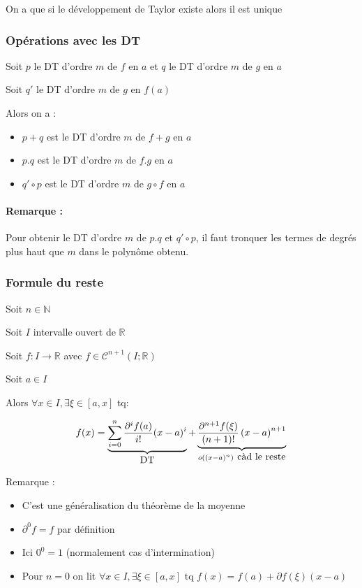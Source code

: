 \documentclass[a4paper,10pt]{article}
\newcommand{\rd}{\circ}
\newcommand{\ap}{\rightarrow}
\newcommand{\R}{\mathbb{R}}
\newcommand{\N}{\mathbb{N}}
\newcommand{\cclass}[3]{\mathcal{C}^{#1} (#2;#3)}
\begin{document}
On a que si le développement de Taylor existe alors il est unique

\subsubsection{Opérations avec les DT}

Soit $p$ le DT d'ordre $m$ de $f$ en $a$ et $q$ le DT d'ordre $m$ de $g$ en $a$

Soit $q'$ le DT d'ordre $m$ de $g$ en $f(a)$

Alors on a :

\begin{itemize}
	\item{$p+q$ est le DT d'ordre $m$ de $f+g$ en $a$}
	\item{$p.q$ est le DT d'ordre $m$ de $f.g$ en $a$}
	\item{$q' \rd p$ est le DT d'ordre $m$ de $g \rd f$ en $a$}
\end{itemize}
\paragraph{Remarque :} Pour obtenir le DT d'ordre $m$ de $p.q$ et $q' \rd p$, il faut tronquer les termes de degrés plus haut que $m$ dans le polynôme obtenu.

\subsubsection{Formule du reste}

Soit $n \in \N$

Soit $I$ intervalle ouvert de $\R$

Soit $f : I \ap \R$ avec $f \in \cclass{n+1}{I}{\R}$

Soit $a \in I$

Alors $\forall x \in I, \exists \xi \in \left[ a,x \right]$ tq:

$$f(x) = \underbrace{\sum_{i=0}^n \frac{\partial^i f(a)}{i!} (x-a)^i}_{\mbox{DT}} + \underbrace{\frac{\partial^{n+1} f(\xi)}{\left( n+1 \right)!} \left( x-a \right)^{n+1}}_{o\left( \left( x-a \right)^n \right) \newline \mbox{ càd le reste}}$$

Remarque :

\begin{itemize}
	\item{C'est une généralisation du théorème de la moyenne}
	\item{$\partial^0 f = f$ par définition}
	\item{Ici $0^0 = 1$ (normalement cas d'intermination)}
	\item{Pour $n = 0$ on lit $\forall x \in I, \exists \xi \in \left[ a,x \right]$ tq $f(x) = f(a) + \partial f(\xi)(x-a)$}	
\end{itemize}
\end{document}
